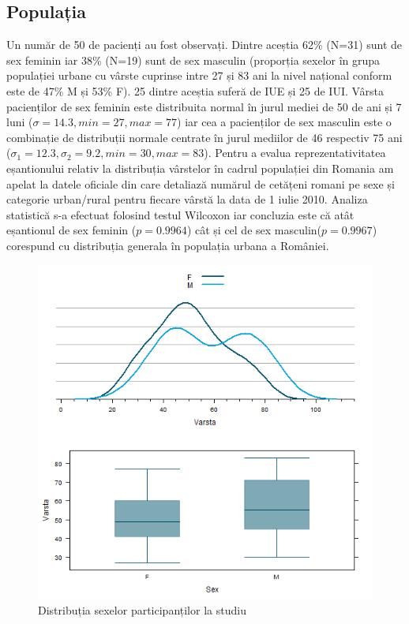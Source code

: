 \documentclass[12pt]{article}
\begin{document}
\subsection{Populația}
 \label{rezPop}
  Un număr de 50 de pacienți au fost observați. Dintre aceștia 62\% (N=31) sunt de sex feminin iar 38\% (N=19) sunt de sex masculin (proporția sexelor în grupa populației urbane cu vârste cuprinse intre 27 și 83 ani la nivel național conform \citep{insee2011} este de 47\% M și 53\% F). 25 dintre aceștia suferă de \ac{IUE} și 25 de \ac{IUI}.
  Vârsta pacienților de sex feminin este distribuita normal în jurul mediei de 50 de ani și 7 luni ($\sigma=14.3,min=27,max=77$) iar cea a pacienților de sex masculin este o combinație de distribuții normale centrate în jurul mediilor de 46 respectiv 75 ani ($\sigma_{1}=12.3 , \sigma_{2}=9.2,min=30,max=83$).
  Pentru a evalua reprezentativitatea eșantionului relativ la distribuția vârstelor în cadrul populației din Romania am apelat la datele oficiale din \citep{insee2011} care detaliază numărul de cetățeni romani pe sexe și categorie urban/rural pentru fiecare vârstă la data de 1 iulie 2010. 
  Analiza statistică s-a efectuat folosind testul Wilcoxon iar concluzia este că atât eșantionul de sex feminin ($p=0.9964$) cât și cel de sex masculin($p=0.9967$) corespund cu distribuția generala în populația urbana a României.
  \begin{figure}[H]
   \centering
   \includegraphics[width=0.8\linewidth]{incoVarstaSex}
   \caption{Distribuția sexelor participanților la studiu}
   \label{fig:Distributia sexelor participantilor la studiu}
  \end{figure}
\end{document}
